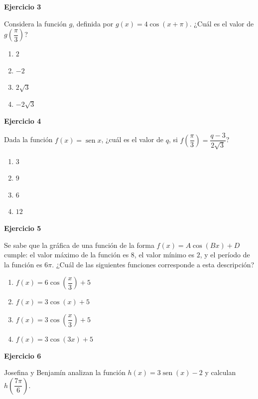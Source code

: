 \documentclass[12pt,letterpaper]{article}
\providecommand{\sen}{\operatorname{sen}}
\begin{document}
\vspace{3.5cm}
\newpage

\textbf{Ejercicio 3}

Considera la función $g$, definida por $g(x) = 4\cos(x+\pi)$. ¿Cuál es el valor de $g\left(\dfrac{\pi}{3}\right)$?

\begin{enumerate}[label=\Alph*)]
    \item $2$
    \item $-2$
    \item $2\sqrt3$
    \item $-2\sqrt3$
\end{enumerate}

\vspace{3.5cm}

\textbf{Ejercicio 4}

Dada la función $f(x) = \sen x$, ¿cuál es el valor de $q$, si $f\left(\dfrac{\pi}{3}\right) = \dfrac{q-3}{2\sqrt3}$?

\begin{enumerate}[label=\Alph*)]
    \item $3$
    \item $9$
    \item $6$
    \item $12$
\end{enumerate}

\vspace{3.5cm}


\textbf{Ejercicio 5}

Se sabe que la gráfica de una función de la forma $f(x)=A\cos(Bx)+D$ cumple: el valor máximo de la función es $8$, el valor mínimo es $2$, y el período de la función es $6\pi$. ¿Cuál de las siguientes funciones corresponde a esta descripción?

\begin{enumerate}[label=\Alph*)]
    \item $f(x) = 6\cos\left(\dfrac{x}{3}\right)+5$
    \item $f(x) = 3\cos(x)+5$
    \item $f(x) = 3\cos\left(\dfrac{x}{3}\right)+5$
    \item $f(x) = 3\cos(3x)+5$
\end{enumerate}

\vspace{3.5cm}
\newpage
\textbf{Ejercicio 6}

Josefina y Benjamín analizan la función $h(x)=3\sen(x)-2$ y calculan $h\left(\dfrac{7\pi}{6}\right)$.
\end{document}
